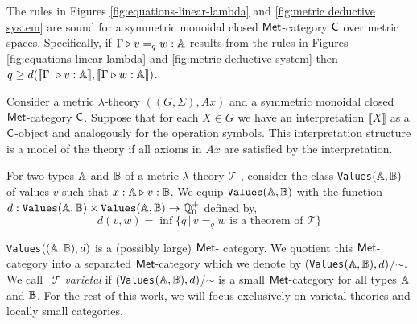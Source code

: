 \begin{theorem} [Soundness] \cite[Theorem 3.14]{dahlqvist2022syntactic}  \label{thm:soundness_metric_no_cond}
  The rules in Figures \ref{fig:equations-linear-lambda} and \ref{fig:metric deductive system} are sound for a  symmetric monoidal closed $\mathsf{Met}$-category  $\mathsf{C}$ over metric spaces. Specifically, if $\Gamma \triangleright v =_{q} w : \mathbb{A} $ results from the rules in Figures \ref{fig:equations-linear-lambda} and \ref{fig:metric deductive system} then $q \geq d( \llbracket \Gamma  \vljud v : \typeA \rrbracket, \llbracket\Gamma \vljud w : \typeA \rrbracket)$.
\end{theorem}


\begin{definition} \label{def:model_metric_no_cond}
  Consider a metric $\lambda$-theory $((G,\Sigma),Ax)$ and a symmetric monoidal closed $\mathsf{Met}$-category $\mathsf{C}$. Suppose that for each $X \in G$ we have an interpretation $\llbracket X \rrbracket$ as a $\mathsf{C}$-object and analogously for the operation symbols. This interpretation structure is a model of the theory if all axioms in $Ax$ are satisfied by the interpretation.
\end{definition}


For two types $\mathbb{A}$ and $\mathbb{B}$ of a metric $\lambda$-theory $\mathscr{T}$ , consider the class \texttt{Values}$(\mathbb{A},\mathbb{B})$ of values $v$ such that $x : \mathbb{A} \triangleright v : \mathbb{B}$. We equip $\texttt{Values}(\mathbb{A},\mathbb{B})$ with the function $d :\texttt{Values}(\mathbb{A},\mathbb{B}) \times \texttt{Values}(\mathbb{A},\mathbb{B}) \rightarrow \mathbb{Q}^{+}_0$ defined by,
$$d(v,w)=\inf{\{q \, \vert \, v=_q w \text{ is a theorem of } \mathscr{T} \}}$$

\texttt{Values}$((\mathbb{A},\mathbb{B}),d)$ is a (possibly large)  $\mathsf{Met}$- category. We  quotient this  $\mathsf{Met}$-category into a separated  $\mathsf{Met}$-category which we denote by (\texttt{Values}$(\mathbb{A},\mathbb{B}),d)$/$\sim$. We call  $\mathscr{T}$ \emph{varietal} if (\texttt{Values}$(\mathbb{A},\mathbb{B}),d)$/$\sim$ is a small  $\mathsf{Met}$-category for all types $\mathbb{A}$ and $\mathbb{B}$. For the rest of this work, we will focus exclusively on varietal theories and locally small categories.

